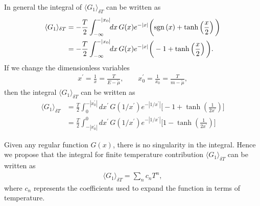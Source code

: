 \documentclass[sn-mathphys,Numbered]{sn-jnl}
\begin{document}
In general the integral of $\langle G_1\rangle_{\delta T}$ can be written as
\begin{align}
\langle G_1\rangle_{\delta T}&=-\frac{T}{2}\int^{-|x_0|}_{-\infty}\!\!dx\,G(x) e^{-|x|}\bigg(\mathrm{sgn}\left(x\right)+\tanh\left(\frac{x}{2}\right)\bigg)\notag\\
&=-\frac{T}{2}\int^{-|x_0|}_{-\infty}\!\!dx\,G(x) e^{-|x|}\bigg(-1+\tanh\left(\frac{x}{2}\right)\bigg).
\end{align}
{
\color{blue} If we change the dimensionless variables 
\begin{align}
x^\prime=\frac{1}{x}=\frac{T}{E-\tilde\mu},\qquad x_0^\prime=\frac{1}{x_0}=\frac{T}{m-\tilde\mu},
\end{align}
then the integral $\langle G_1\rangle_{\delta T}$ can be written as
\begin{align}
\langle G_1\rangle_{\delta T}&=\frac{T}{2}\int^{-|x_0^\prime|}_{0}\!\!dx^\prime\,G(1/x^\prime) e^{-|1/x^\prime|}\bigg[-1+\tanh\left(\frac{1}{2x^\prime}\right)\bigg]\\
&=\frac{T}{2}\int_{-|x_0^\prime|}^{0}\!\!dx^\prime\,G(1/x^\prime) e^{-|1/x^\prime|}\bigg[1-\tanh\left(\frac{1}{2x^\prime}\right)\bigg]
\end{align}
}

 Given any regular function $G(x)$, there is no singularity in the integral. Hence we propose that the integral for finite temperature contribution $\langle G_1\rangle_{\delta T}$ can be written as
\begin{align}\label{finite expansion}
\langle G_1\rangle_{\delta T}=\sum_{n}c_nT^n,
\end{align}
where $c_n$ represents the coefficients used to expand the function in terms of temperature.


\end{document}

